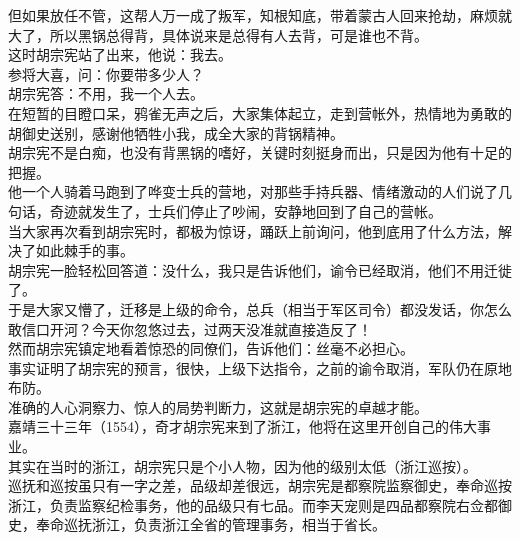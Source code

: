 \begin{multicols}{\theparacolNo}
但如果放任不管，这帮人万一成了叛军，知根知底，带着蒙古人回来抢劫，麻烦就大了，所以黑锅总得背，具体说来是总得有人去背，可是谁也不背。\\

这时胡宗宪站了出来，他说：我去。\\

参将大喜，问：你要带多少人？\\

胡宗宪答：不用，我一个人去。\\

在短暂的目瞪口呆，鸦雀无声之后，大家集体起立，走到营帐外，热情地为勇敢的胡御史送别，感谢他牺牲小我，成全大家的背锅精神。\\

胡宗宪不是白痴，也没有背黑锅的嗜好，关键时刻挺身而出，只是因为他有十足的把握。\\

他一个人骑着马跑到了哗变士兵的营地，对那些手持兵器、情绪激动的人们说了几句话，奇迹就发生了，士兵们停止了吵闹，安静地回到了自己的营帐。\\

当大家再次看到胡宗宪时，都极为惊讶，踊跃上前询问，他到底用了什么方法，解决了如此棘手的事。\\

胡宗宪一脸轻松回答道：没什么，我只是告诉他们，谕令已经取消，他们不用迁徙了。\\

于是大家又懵了，迁移是上级的命令，总兵（相当于军区司令）都没发话，你怎么敢信口开河？今天你忽悠过去，过两天没准就直接造反了！\\

然而胡宗宪镇定地看着惊恐的同僚们，告诉他们：丝毫不必担心。\\

事实证明了胡宗宪的预言，很快，上级下达指令，之前的谕令取消，军队仍在原地布防。\\

准确的人心洞察力、惊人的局势判断力，这就是胡宗宪的卓越才能。\\

嘉靖三十三年（1554），奇才胡宗宪来到了浙江，他将在这里开创自己的伟大事业。\\

其实在当时的浙江，胡宗宪只是个小人物，因为他的级别太低（浙江巡按）。\\

巡抚和巡按虽只有一字之差，品级却差很远，胡宗宪是都察院监察御史，奉命巡按浙江，负责监察纪检事务，他的品级只有七品。而李天宠则是四品都察院右佥都御史，奉命巡抚浙江，负责浙江全省的管理事务，相当于省长。\\


\end{multicols}
